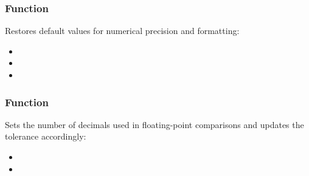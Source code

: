\subsubsection{Function }
\label{ssub:tkz_reset_defaults}

Restores default values for numerical precision and formatting:
\begin{itemize}
  \item {}
  \item {}
  \item {}
\end{itemize}


\subsubsection{Function }
\label{ssub:tkz_set_nb_dec}


Sets the number of decimals used in floating-point comparisons and updates the tolerance accordingly:
\begin{itemize}
  \item {}
  \item {}
\end{itemize}
\endinput